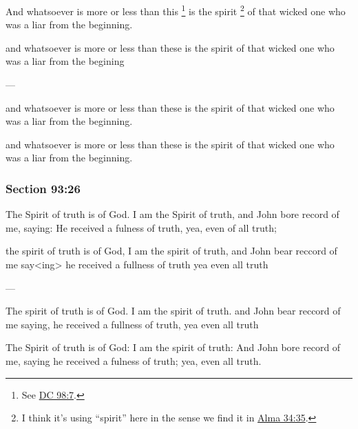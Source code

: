 		And whatsoever is more or less than this%
			\footnote{%
				See \hyperref[DC98-7]{DC 98:7}.
				}
		is the spirit%
			\footnote{%
				I think it's using ``spirit'' here in the sense we find it in \hyperref[ALMA-34-35]{Alma 34:35}.
				}
		of that wicked one who was a liar from the beginning.

		\begin{framed}
		\scriptsize
			\begin{compactdesc}
				\item[JSP] and whatsoever is more or less than these is the spirit of that wicked one who was a liar from the begining
				\item[BC] ---
				\item[RB2] and whatsoever is more or less than these is the spirit of that wicked one who was a liar from the beginning. 
				\item[RB1] and whatsoever is more or less than these is the spirit of that wicked one who was a liar from the beginning.
			\end{compactdesc}
		\end{framed}

	\subsubsection{Section 93:26} %
		\label{DC93-26}

		The Spirit of truth is of God. I am the Spirit of truth, and John bore record of me, saying: He received a fulness of truth, yea, even of all truth;

		\begin{framed}
		\scriptsize
			\begin{compactdesc}
				\item[JSP] the spirit of truth is of God, I am the spirit of truth, and John bear reccord of me say<ing> he received a fullness of truth yea even all truth
				\item[BC] ---
				\item[RB2] The spirit of truth is of God. I am the spirit of truth. and John bear reccord of me saying, he received a fullness of truth, yea even all truth 
				\item[RB1] [paragraph break] The Spirit of truth is of God: I am the spirit of truth: And John bore record of me, saying he received a fulness of truth; yea, even all truth. 
			\end{compactdesc}
		\end{framed}

